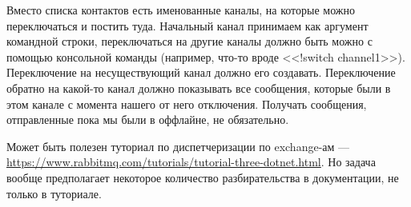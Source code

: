 \documentclass[a5paper]{article}
\begin{document}
Вместо списка контактов есть именованные каналы, на которые можно переключаться и постить туда. Начальный канал принимаем как аргумент командной строки, переключаться на другие каналы должно быть можно с помощью консольной команды (например, что-то вроде <<!switch channel1>>). Переключение на несуществующий канал должно его создавать. Переключение обратно на какой-то канал должно показывать все сообщения, которые были в этом канале с момента нашего от него отключения. Получать сообщения, отправленные пока мы были в оффлайне, не обязательно.

Может быть полезен туториал по диспетчеризации по exchange-ам --- \url{https://www.rabbitmq.com/tutorials/tutorial-three-dotnet.html}. Но задача вообще предполагает некоторое количество разбирательства в документации, не только в туториале.
\end{document}
